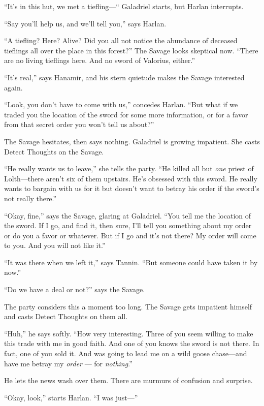 \documentclass[smalldemyvopaper,11pt,twoside,onecolumn,openright,extrafontsizes]{memoir}
\begin{document}
``It's in this hut, we met a tiefling---`` Galadriel starts, but Harlan
interrupts.

``Say you'll help us, and we'll tell you,'' says Harlan.

``A tiefling? Here? Alive? Did you all not notice the abundance of
deceased tieflings all over the place in this forest?'' The Savage looks
skeptical now. ``There are no living tieflings here. And no sword of
Valorius, either.''

``It's real,'' says Hanamir, and his stern quietude makes the Savage
interested again.

``Look, you don't have to come with us,'' concedes Harlan. ``But what if
we traded you the location of the sword for some more information, or
for a favor from that secret order you won't tell us about?''

The Savage hesitates, then says nothing. Galadriel is growing impatient.
She casts Detect Thoughts on the Savage.

``He really wants us to leave,'' she tells the party. ``He killed all
but \emph{one} priest of Lolth---there aren't six of them upstairs. He's
obsessed with this sword. He really wants to bargain with us for it but
doesn't want to betray his order if the sword's not really there.''

``Okay, fine,'' says the Savage, glaring at Galadriel. ``You tell me the
location of the sword. If I go, and find it, then sure, I'll tell you
something about my order or do you a favor or whatever. But if I go and
it's not there? My order will come to you. And you will not like it.''

``It was there when we left it,'' says Tannin. ``But someone could have
taken it by now.''

``Do we have a deal or not?'' says the Savage.

The party considers this a moment too long. The Savage gets impatient
himself and casts Detect Thoughts on them all.

``Huh,'' he says softly. ``How very interesting. Three of you seem
willing to make this trade with me in good faith. And one of you knows
the sword is not there. In fact, one of you sold it. And was going to
lead me on a wild goose chase---and have me betray my \emph{order} ---
for \emph{nothing}.''

He lets the news wash over them. There are murmurs of confusion and
surprise.

``Okay, look,'' starts Harlan. ``I was just---''
\end{document}
